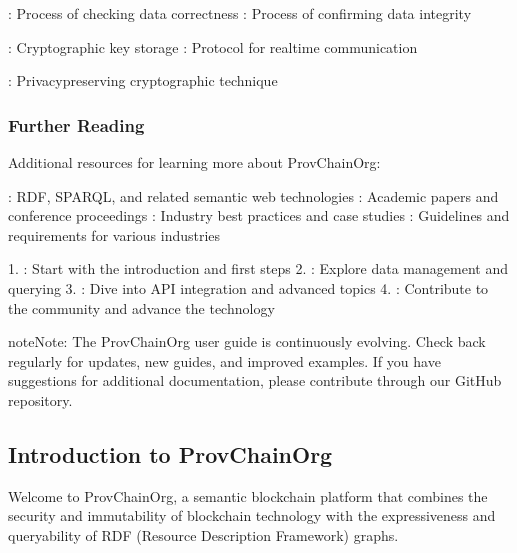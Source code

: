 \documentclass[letterpaper,10pt,english]{sphinxmanual}
\begin{document}
\sphinxAtStartPar
{}
\sphinxhyphen{} : Process of checking data correctness
\sphinxhyphen{} : Process of confirming data integrity

\sphinxAtStartPar
{}
\sphinxhyphen{} : Cryptographic key storage
\sphinxhyphen{} : Protocol for real\sphinxhyphen{}time communication

\sphinxAtStartPar
{}
\sphinxhyphen{} : Privacy\sphinxhyphen{}preserving cryptographic technique


\subsubsection{Further Reading}
\label{\detokenize{user-guide/index:further-reading}}
\sphinxAtStartPar
Additional resources for learning more about ProvChainOrg:

\sphinxAtStartPar
{}
\sphinxhyphen{} : RDF, SPARQL, and related semantic web technologies
\sphinxhyphen{} : Academic papers and conference proceedings
\sphinxhyphen{} : Industry best practices and case studies
\sphinxhyphen{} : Guidelines and requirements for various industries

\sphinxAtStartPar
{}
1. : Start with the introduction and first steps
2. : Explore data management and querying
3. : Dive into API integration and advanced topics
4. : Contribute to the community and advance the technology

\begin{sphinxadmonition}{note}{Note:}
\sphinxAtStartPar
The ProvChainOrg user guide is continuously evolving. Check back regularly for updates, new guides, and improved examples. If you have suggestions for additional documentation, please contribute through our GitHub repository.
\end{sphinxadmonition}



\sphinxstepscope


\subsection{Introduction to ProvChainOrg}
\label{\detokenize{user-guide/introduction:introduction-to-provchainorg}}\label{\detokenize{user-guide/introduction::doc}}
\sphinxAtStartPar
Welcome to ProvChainOrg, a semantic blockchain platform that combines the security and immutability of blockchain technology with the expressiveness and queryability of RDF (Resource Description Framework) graphs.
\end{document}
